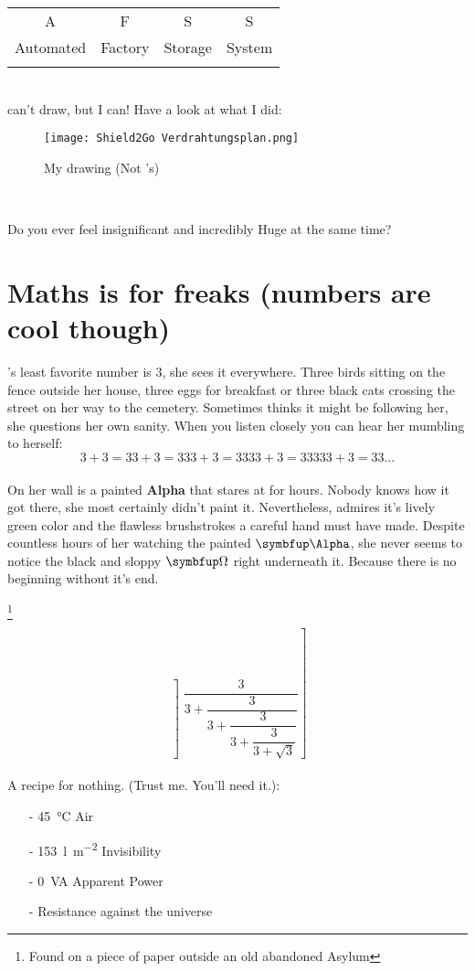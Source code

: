 \documentclass{article}
\begin{document}
\begin{tabular}{cccc}
A & F & S & S \\
Automated & Factory & Storage & System \\
\label{Listing 1}
\end{tabular}\\[1cm]

\TheWriter{} can't draw, but I can! Have a look at what I did:\\
\begin{figure}[hb]
    \texttt{[image: Shield2Go Verdrahtungsplan.png]}
    \caption{My drawing (Not \TheWriter's)}
    \label{Figure}
\end{figure}\\[1cm]

\begin{Center}
    \Huge Do \normalsize you \Large ever \huge feel \tiny insignificant \large and \normalsize incredibly \Huge Huge \footnotesize at \Large the \small same \huge time?
\end{Center}

\newpage \section*{Maths is for freaks (numbers are cool though)}
\TheWriter's least favorite number is 3, she sees it everywhere. Three birds sitting on the fence outside her house, three eggs for breakfast or three black cats crossing the street on her way to the cemetery. Sometimes \TheWriter{} thinks it might be following her, she questions her own sanity. When you listen closely you can hear her mumbling to herself:
\[3+3=33+3=333+3=3333+3=33333+3=33\dots\]\\[1cm]

\NewDocumentCommand{\bAlpha}{}{\symbfup{\Alpha}}
\NewDocumentCommand{\bOmega}{}{\symbfup{\Omega}}
On her wall is a painted \textbf{Alpha} that \TheWriter{} stares at for hours. Nobody knows how it got there, she most certainly didn't paint it. Nevertheless, \TheWriter{} admires it's lively green color and the flawless brushstrokes a careful hand must have made. Despite countless hours of her watching the painted \(\bAlpha\), she never seems to notice the black and sloppy \(\bOmega\) right underneath it. Because there is no beginning without it's end.\\[1cm]

\begin{flushright}
    \footnote{Found on a piece of paper outside an old abandoned Asylum}
\end{flushright}
\[
\left]
\dfrac{3}{3 +
\dfrac{3}{3 +
\dfrac{3}{3 +
\dfrac{3}{3 +
\sqrt{3}}}}}
\right]
\]\\[1cm]

A recipe for nothing. (Trust me. You'll need it.):\\
\begin{itemize}
    \item[-] \qty{45}{\degreeCelsius} Air
    \item[-] \qty{153}{\l\per\m\squared} Invisibility
    \item[-] \qty{0}{VA} Apparent Power
    \item[-]  Resistance against the universe
\end{itemize} \newpage
\end{document}
